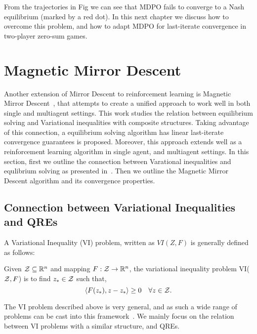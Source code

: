 
From the trajectories in Fig  we can see that MDPO fails to converge to a Nash equilibrium (marked by a red dot).
In this next chapter we discuss how to overcome this problem, and how to adapt MDPO for last-iterate convergence in two-player zero-sum games.

\section[MMD]{Magnetic Mirror Descent}

Another extension of Mirror Descent to reinforcement learning is Magnetic Mirror Descent~\cite{sokotaUnified2023}, 
that attempts to create a unified approach to work well in both single and multiagent settings.
This work studies the relation between equilibrium solving and Variational inequalities with composite structures. 
Taking advantage of this connection, a equilibrium solving algorithm has linear last-iterate convergence guarantees is proposed. 
Moreover, this approach extends well as a reinforcement learning algorithm in single agent, and multiagent settings.
In this section, first we outline the connection between Varational inequalities and equlibrium solving as presented in~\cite{sokotaUnified2023}. 
Then we outline the Magnetic Mirror Descent algorithm and its convergence properties.

\subsection{Connection between Variational Inequalities and QREs}
A Variational Inequality (VI) problem, written as $VI(Z, F)$ is generally defined as follows:
\begin{definition}
	\label{def:vi}
	Given $\mathcal{Z}
		\subseteq \mathbb{R}^n$ and mapping $F: \mathcal{Z} \rightarrow \mathbb{R}^n$, the variational inequality problem VI($\mathcal{Z}, F$) 
		is to find $z_{\ast} \in \mathcal{Z}$ such that,
	\[ \langle F(z_{\ast}),
		z - z_{\ast} \rangle \geq 0 \quad \forall z \in \mathcal{Z}.
	\]
\end{definition}

The VI problem described above is very general, and as such a wide range of problems can be cast into this 
framework~\cite{facchineiFiniteDimensional2004}. We mainly focus on the relation between VI problems with a similar structure, 
and QREs.

